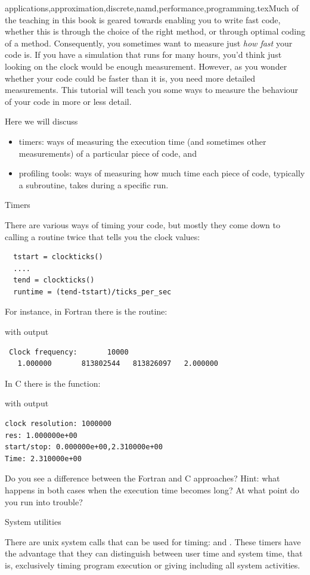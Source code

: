 {applications,approximation,discrete,namd,performance,programming}.texMuch of the teaching in this book is geared towards enabling you to
write fast code, whether this is through the choice of the right
method, or through optimal coding of a method. Consequently, you
sometimes want to measure just \emph{how fast} your code is. If you
have a simulation that runs for many hours, you'd think just looking
on the clock would be enough measurement. However, as you wonder
whether your code could be faster than it is, you need more detailed
measurements. This tutorial will teach you some ways to measure the
behaviour of your code in more or less detail.

Here we will discuss 
\begin{itemize}
\item timers: ways of measuring the execution time (and sometimes
  other measurements) of a particular piece of code, and
\item profiling tools: ways of measuring how much time each piece of
  code, typically a subroutine, takes during a specific run.
\end{itemize}

 {Timers}

There are various ways of timing your code, but mostly they come down
to calling a routine twice that tells you the clock values:
\begin{verbatim}
  tstart = clockticks()
  ....
  tend = clockticks()
  runtime = (tend-tstart)/ticks_per_sec
\end{verbatim}
For instance, in Fortran there is the 
routine:

with output
\begin{verbatim}
 Clock frequency:       10000
   1.000000       813802544   813826097   2.000000  
\end{verbatim}
In C there is the  function:

with output
\begin{verbatim}
clock resolution: 1000000
res: 1.000000e+00
start/stop: 0.000000e+00,2.310000e+00
Time: 2.310000e+00
\end{verbatim}
Do you see a difference between the Fortran and C approaches? Hint:
what happens in both cases when the execution time becomes long? At
what point do you run into trouble?

 {System utilities}

There are unix system calls that can be used for timing: 
and . These timers have the advantage that they can
distinguish between user time and system time, that is, exclusively
timing program execution or giving 
including all system activities.

